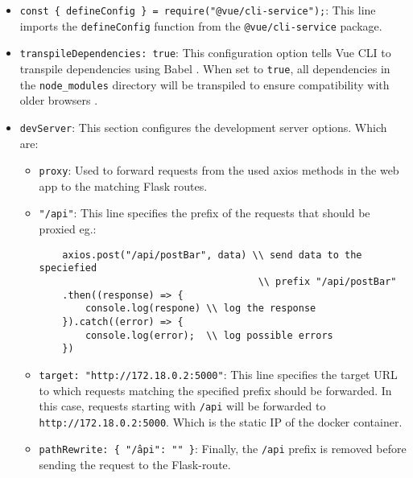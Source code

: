 \documentclass[sn-mathphys-num]{sn-jnl}%
\theoremstyle{thmstyleone}%
\theoremstyle{thmstyletwo}%
\theoremstyle{thmstylethree}%
\begin{document}
\begin{itemize}
    \item \texttt{const \{ defineConfig \} = require("@vue/cli-service");}: This line imports the \texttt{defineConfig} function from the \texttt{@vue/cli-service} package.
    
    \item \texttt{transpileDependencies: true}: This configuration option tells Vue CLI to transpile dependencies using Babel \cite{vuecli}. When set to \texttt{true}, all dependencies in the \texttt{node\_modules} directory will be transpiled to ensure compatibility with older browsers \cite{vuecli}.
    
    \item \texttt{devServer}: This section configures the development server options. Which are:
    \begin{itemize}
    \item \texttt{proxy}: Used to forward requests from the used axios methods in the web app to the matching Flask routes. 
    
    \item \texttt{"/api"}: This line specifies the prefix of the requests that should be proxied eg.:

    \begin{verbatim}
    axios.post("/api/postBar", data) \\ send data to the speciefied  
                                      \\ prefix "/api/postBar"
    .then((response) => {
        console.log(respone) \\ log the response
    }).catch((error) => {
        console.log(error);  \\ log possible errors
    })
    \end{verbatim}
    
    \item \texttt{target: "http://172.18.0.2:5000"}: This line specifies the target URL to which requests matching the specified prefix should be forwarded. In this case, requests starting with \texttt{/api} will be forwarded to \texttt{http://172.18.0.2:5000}. Which is the static IP of the docker container.
    
    \item \texttt{pathRewrite: \{ "\^/api": "" \}}: Finally, the \texttt{/api} prefix is removed before sending the request to the Flask-route.
    \end{itemize}
\end{itemize}
\end{document}
